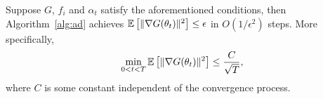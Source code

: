 Suppose $G$, $f_i$ and $\alpha_t$ satisfy the aforementioned conditions, then
Algorithm~\ref{alg:ad} achieves $\mathbb{E} \left[ \lVert \nabla G(\theta_t) \rVert^2 \right] \leq \epsilon$ in
$O(1/\epsilon^2)$ steps. More specifically,
\begin{align}
\min\limits_{0 < t < T} \mathbb{E} \left[ \lVert \nabla G(\theta_t) \rVert^2 \right] \leq \frac{C}{\sqrt{T}},
\end{align}
where $C$ is some constant independent of the convergence process.
